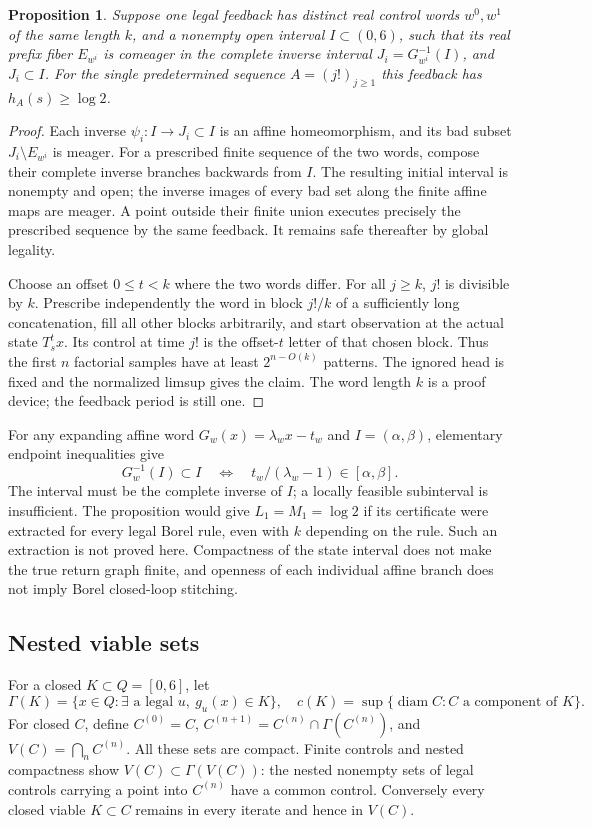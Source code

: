 \documentclass[11pt,reqno]{amsart}
\numberwithin{equation}{section}
\newtheorem{proposition}[theorem]{Proposition}
\theoremstyle{definition}
\begin{document}
\begin{proposition}\label{prop:return-certificate}
Suppose one legal feedback has distinct real control words $w^0,w^1$
of the same length $k$, and a nonempty open interval $I\subset(0,6)$,
such that its real prefix fiber $E_{w^i}$ is comeager in the complete
inverse interval $J_i=G_{w^i}^{-1}(I)$, and $J_i\subset I$.
For the single predetermined sequence $A=(j!)_{j\ge1}$ this
feedback has $h_A(s)\ge\log2$.
\end{proposition}
\begin{proof}
Each inverse $\psi_i:I\to J_i\subset I$ is an affine
homeomorphism, and its bad subset $J_i\setminus E_{w^i}$ is
meager. For a prescribed finite sequence of the two words, compose
their complete inverse branches backwards from $I$. The resulting
initial interval is nonempty and open; the inverse images of every
bad set along the finite affine maps are meager. A point outside
their finite union executes precisely the prescribed sequence by
the same feedback. It remains safe thereafter by global legality.

Choose an offset $0\le t<k$ where the two words differ. For
all $j\ge k$, $j!$ is divisible by $k$. Prescribe independently
the word in block $j!/k$ of a sufficiently long concatenation,
fill all other blocks arbitrarily, and start observation at the
actual state $T_s^t x$. Its control at time $j!$ is the offset-$t$
letter of that chosen block. Thus the first $n$ factorial samples
have at least $2^{n-O(k)}$ patterns. The ignored head is fixed
and the normalized limsup gives the claim. The word length $k$
is a proof device; the feedback period is still one.
\end{proof}

For any expanding affine word $G_w(x)=\lambda_w x-t_w$ and
$I=(\alpha,\beta)$, elementary endpoint inequalities give
\[
 G_w^{-1}(I)\subset I
 \quad\Longleftrightarrow\quad
 t_w/(\lambda_w-1)\in[\alpha,\beta].
\]
The interval must be the complete inverse of $I$; a locally feasible
subinterval is insufficient. The proposition would give
$L_1=M_1=\log2$ if its certificate were extracted for every
legal Borel rule, even with $k$ depending on the rule. Such an
extraction is not proved here. Compactness of the state interval
does not make the true return graph finite, and openness of each
individual affine branch does not imply Borel closed-loop stitching.

\subsection{Nested viable sets}
For a closed $K\subset Q=[0,6]$, let
\[
 \Gamma(K)=\{x\in Q:\exists\text{ a legal }u,\ g_u(x)\in K\},
 \quad c(K)=\sup\{\operatorname{diam}C:C\text{ a component of }K\}.
\]
For closed $C$, define $C^{(0)}=C$,
$C^{(n+1)}=C^{(n)}\cap\Gamma(C^{(n)})$, and
$V(C)=\bigcap_n C^{(n)}$. All these sets are compact.
Finite controls and nested compactness show $V(C)\subset\Gamma(V(C))$:
the nested nonempty sets of legal controls carrying a point into
$C^{(n)}$ have a common control. Conversely every closed viable
$K\subset C$ remains in every iterate and hence in $V(C)$.
\end{document}
